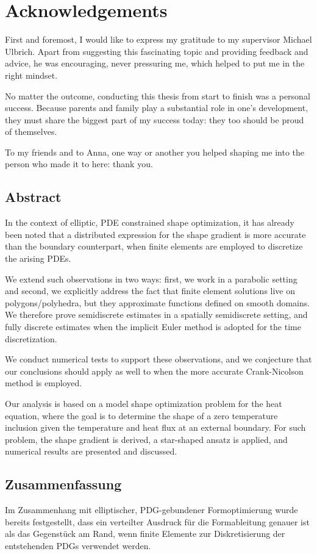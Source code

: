 \documentclass[english,a4paper,9pt,oneside]{scrbook}	%
\theoremstyle{break}
\theoremstyle{remark}
\begin{document}
\chapter*{Acknowledgements}

First and foremost, I would like to express my gratitude to my supervisor Michael Ulbrich. Apart from suggesting this fascinating topic and providing feedback and advice, he was encouraging, never pressuring me, which helped to put me in the right mindset.

No matter the outcome, conducting this thesis from start to finish was a personal success. Because parents and family play a substantial role in one's development, they must share the biggest part of my success today: they too should be proud of themselves. 

To my friends and to Anna, one way or another you helped shaping me into the person who made it to here: thank you.  

\newpage
\section*{Abstract}
In the context of elliptic, PDE constrained shape optimization, it has already been noted that a distributed expression for the shape gradient is more accurate than the boundary counterpart, when finite elements are employed to discretize the arising PDEs. 

We extend such observations in two ways: first, we work in a parabolic setting and second, we explicitly address the fact that finite element solutions live on polygons/polyhedra, but they approximate functions defined on smooth domains. We therefore prove semidiscrete estimates in a spatially semidiscrete setting, and fully discrete estimates when the implicit Euler method is adopted for the time discretization.

We conduct numerical tests to support these observations, and we conjecture that our conclusions should apply as well to when the more accurate Crank-Nicolson method is employed.

Our analysis is based on a model shape optimization problem for the heat equation, where the goal is to determine the shape of a zero temperature inclusion given the temperature and heat flux at an external boundary. For such problem, the shape gradient is derived, a star-shaped ansatz is applied, and numerical results are presented and discussed.

\section*{Zusammenfassung}
Im Zusammenhang mit elliptischer, PDG-gebundener Formoptimierung wurde bereits festgestellt, dass ein verteilter Ausdruck für die Formableitung genauer ist als das Gegenstück am Rand, wenn finite Elemente zur Diskretisierung der entstehenden PDGs verwendet werden. 
\end{document}
